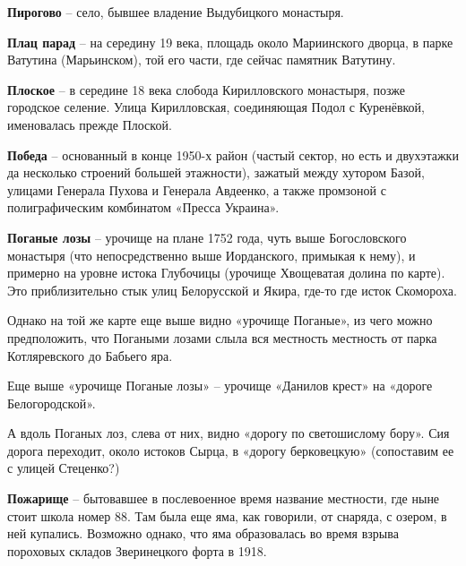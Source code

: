 \medskip

\textbf{Пирогово} – село, бывшее владение Выдубицкого монастыря.\\


\medskip

\textbf{Плац парад} – на середину 19 века, площадь около Мариинского дворца, в парке Ватутина (Марьинском), той его части, где сейчас памятник Ватутину.\\


\medskip

\textbf{Плоское} – в середине 18 века слобода Кирилловского монастыря, позже городское селение. Улица Кирилловская, соединяющая Подол с Куренёвкой, именовалась прежде Плоской.\\


\medskip

\textbf{Победа} – основанный в конце 1950-х район (частый сектор, но есть и двухэтажки да несколько строений большей этажности), зажатый между хутором Базой, улицами Генерала Пухова и Генерала Авдеенко, а также промзоной с полиграфическим комбинатом «Пресса Украина».\\ 


\medskip

\textbf{Поганые лозы} – урочище на плане 1752 года, чуть выше Богословского монастыря (что непосредственно выше Иорданского, примыкая к нему), и примерно на уровне истока Глубочицы (урочище Хвощеватая долина по карте). Это приблизительно стык улиц Белорусской и Якира, где-то где исток Скомороха.
  
   Однако на той же карте еще выше видно «урочище Поганые», из чего можно предположить, что Погаными лозами слыла вся местность местность от парка Котляревского до Бабьего яра.

    Еще выше «урочище Поганые лозы» – урочище «Данилов крест» на «дороге Белогородской». 

А вдоль Поганых лоз, слева от них, видно «дорогу по светошислому бору». Сия дорога переходит, около истоков Сырца, в «дорогу берковецкую» (сопоставим ее с улицей Стеценко?)

\medskip

\textbf{Пожарище} – бытовавшее в послевоенное время название местности, где ныне стоит школа номер 88. Там была еще яма, как говорили, от снаряда, с озером, в ней купались. Возможно однако, что яма образовалась во время взрыва пороховых складов Зверинецкого форта в 1918.\\

\medskip

